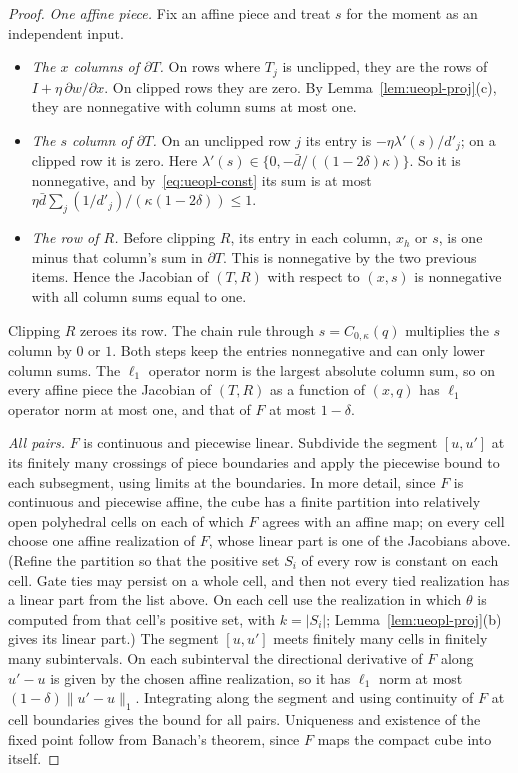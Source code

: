 \begin{proof}
\emph{One affine piece.} Fix an affine piece and treat $s$ for the moment as an independent input.
\begin{itemize}[nosep]
  \item \emph{The $x$ columns of $\partial T$.} On rows where $T_j$ is unclipped, they are the rows of
        $I+\eta\,\partial w/\partial x$. On clipped rows they are zero. By
        Lemma~\ref{lem:ueopl-proj}(c), they are nonnegative with column sums at most one.
  \item \emph{The $s$ column of $\partial T$.} On an unclipped row $j$ its entry is $-\eta\lambda'(s)/d'_j$;
        on a clipped row it is zero. Here
        $\lambda'(s)\in\{0,-\bar d/((1-2\delta)\kappa)\}$. So it is nonnegative, and
        by~\eqref{eq:ueopl-const} its sum is at most
        $\eta\bar d\sum_j(1/d'_j)/(\kappa(1-2\delta))\le1$.
  \item \emph{The row of $R$.} Before clipping $R$, its entry in each column, $x_h$ or $s$, is one minus
        that column's sum in $\partial T$. This is nonnegative by the two previous items. Hence the
        Jacobian of $(T,R)$ with respect to $(x,s)$ is nonnegative with all column sums equal to one.
\end{itemize}
Clipping $R$ zeroes its row. The chain rule through $s=C_{0,\kappa}(q)$ multiplies the $s$ column by $0$
or $1$. Both steps keep the entries nonnegative and can only lower column sums. The $\ell_1$ operator norm
is the largest absolute column sum, so on every affine piece the Jacobian of $(T,R)$ as a function of
$(x,q)$ has $\ell_1$ operator norm at most one, and that of $F$ at most $1-\delta$.

\emph{All pairs.} $F$ is continuous and piecewise linear. Subdivide the segment $[u,u']$ at its finitely
many crossings of piece boundaries and apply the piecewise bound to each subsegment, using limits at the
boundaries. In more detail, since $F$ is continuous and piecewise affine, the cube has a finite partition into
relatively open polyhedral cells on each of which $F$ agrees with an affine map; on every cell choose
one affine realization of $F$, whose linear part is one of the Jacobians above. (Refine the partition so that the positive set $S_i$ of every row is constant on each cell. Gate ties may persist on a whole cell, and then not every tied realization has a linear part from the list above. On each cell use the realization in which $\theta$ is computed from that cell's positive set, with $k=|S_i|$; Lemma~\ref{lem:ueopl-proj}(b) gives its linear part.) The segment $[u,u']$ meets finitely many cells
in finitely many subintervals. On each subinterval the directional derivative of $F$ along $u'-u$ is
given by the chosen affine realization, so it has $\ell_1$ norm at most $(1-\delta)\|u'-u\|_1$.
Integrating along the segment and using continuity of $F$ at cell boundaries gives the bound for all
pairs. Uniqueness and existence
of the fixed point follow from Banach's theorem, since $F$ maps the compact cube into itself.


\end{proof}
